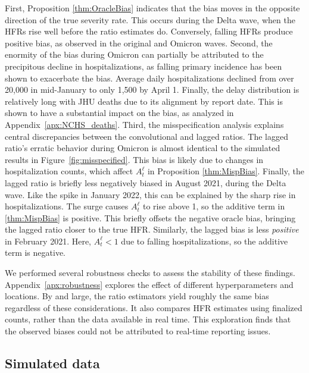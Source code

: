 \documentclass{article}
\begin{document}
First, Proposition \ref{thm:OracleBias} indicates that the bias moves in the opposite direction of the true severity rate. This occurs during the Delta wave, when the HFRs rise well before the ratio estimates do. Conversely, falling HFRs produce positive bias, as observed in the original and Omicron waves.
Second, the enormity of the bias during Omicron can partially be attributed to the precipitous decline in hospitalizations, as falling primary incidence has been shown to exacerbate the bias. Average daily hospitalizations declined from over 20,000 in mid-January to only 1,500 by April 1. 
Finally, the delay distribution is relatively long with JHU deaths due to its alignment by report date. This is shown to have a substantial impact on the bias, as analyzed in Appendix~\ref{apx:NCHS_deaths}.
Third, the misspecification analysis explains central discrepancies between the
convolutional and lagged ratios. The lagged ratio's erratic behavior during
Omicron is almost identical to the simulated results in
Figure~\ref{fig:misspecified}. This bias is likely due to changes in
hospitalization counts, which affect $A_t^\ell$ in Proposition \ref{thm:MispBias}.
Finally, the lagged ratio is briefly less negatively biased in August 2021, during the Delta wave. Like the spike in January 2022, this can be explained by the sharp rise in hospitalizations. The surge causes $A_t^\ell$ to rise above 1, so the additive term in \ref{thm:MispBias} is positive. This briefly offsets the negative oracle bias, bringing the lagged ratio closer to the true HFR. Similarly, the lagged bias is less \textit{positive} in February 2021. Here, $A_t^\ell < 1$ due to falling hospitalizations, so the additive term is negative. 

We performed several robustness checks to assess the stability of these findings. Appendix~\ref{apx:robustness} explores the effect of different hyperparameters and locations. By and large, the ratio estimators yield roughly the same bias regardless of these considerations. It also compares HFR estimates using finalized counts, rather than the data available in real time. This exploration finds that the observed biases could not be attributed to real-time reporting issues. 

\subsection{Simulated data}\label{sec:results_sim}
\end{document}
